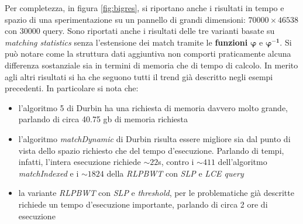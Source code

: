 Per completezza, in figura \ref{fig:bigres}, si riportano anche i risultati in
tempo 
e spazio di una sperimentazione su un pannello di grandi dimensioni:
$70000\times 46538$ con $30000$ query. Sono riportati anche i risultati delle
tre varianti basate su \textit{matching statistics} senza l'estensione dei match
tramite le \textbf{funzioni} $\boldsymbol \varphi$ e
$\boldsymbol\varphi^{\mathbf{-1}}$. Si può notare come la struttura dati aggiuntiva
non comporti praticamente alcuna differenza sostanziale sia in termini di
memoria che di tempo di calcolo. In merito agli altri risultati si ha che
seguono tutti il trend già descritto negli esempi precedenti. In particolare si
nota che:
\begin{itemize}
  \item l'algoritmo 5 di Durbin ha una richiesta di memoria davvero molto
  grande, parlando di circa 40.75 gb di memoria richiesta
  \item l'algoritmo \textit{matchDynamic} di Durbin risulta essere migliore sia
  dal punto di vista dello spazio richiesto che del tempo d'esecuzione. Parlando
  di tempi, infatti, l'intera esecuzione richiede $\sim 22$s, contro i $\sim
  411$ dell'algoritmo \textit{matchIndexed} e i $\sim 1824$ della
  \textit{RLPBWT} con \textit{SLP} e \textit{LCE query}
  \item la variante \textit{RLPBWT} con \textit{SLP} e \textit{threshold}, per
  le problematiche già descritte richiede un tempo d'esecuzione importante,
  parlando di circa 2 ore di esecuzione
\end{itemize}
